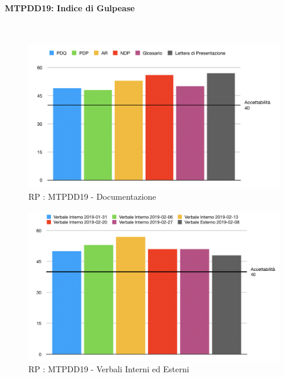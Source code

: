 \pagebreak

\paragraph{MTPDD19: Indice di Gulpease}\-\\
\label{gulpi}

\begin{figure}[H]
	\begin{center}
		\includegraphics[scale=0.6]{./images/grafici_RP/gulpeasedocumenti.png} 
	\end{center}
	\caption{RP : MTPDD19 - Documentazione}
\end{figure}

\begin{figure}[H]
	\begin{center}
		\includegraphics[scale=0.5]{./images/grafici_RP/gulpeaseverbali.png} 
	\end{center}
	\caption{RP : MTPDD19 - Verbali Interni ed Esterni}
\end{figure}


